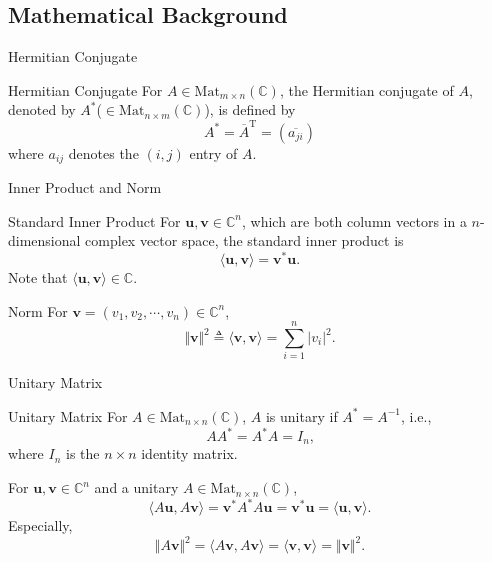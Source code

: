 \documentclass{beamer}
\newcommand{\mbb}[1]{\mathbb{#1}}
\newcommand{\mbf}[1]{\mathbf{#1}}
\newcommand{\mrm}[1]{\mathrm{#1}}
\renewcommand{\:}{\text{ }}
\begin{document}
    \subsection{Mathematical Background}
    \begin{frame}{Hermitian Conjugate}
        \begin{exampleblock}{Hermitian Conjugate}
            For $A \in \mrm{Mat}_{m \times n}(\mbb{C})$, the \alert{Hermitian conjugate} of $A$, denoted by $A^\ast$($\in \mrm{Mat}_{n \times m}(\mbb{C})$), is defined by
            \[ A^\ast = \overline{A}^\mrm{T} = (\overline{a_{ji}}) \]
            where $a_{ij}$ denotes the $(i, j)$ entry of $A$.
        \end{exampleblock}
    \end{frame}

    \begin{frame}{Inner Product and Norm}
        \begin{exampleblock}{Standard Inner Product}
            For $\mbf{u}, \mbf{v} \in \mbb{C}^n$, which are both column vectors in a $n$-dimensional complex vector space,
            the standard inner product is
            \[ \langle \mbf{u}, \mbf{v} \rangle = \mbf{v}^\ast \mbf{u}\text{.} \]
            Note that $\langle \mbf{u}, \mbf{v} \rangle \in \mbb{C}$.
        \end{exampleblock}
        \begin{exampleblock}{Norm}
            For $\mbf{v} = (v_1, v_2, \cdots, v_n) \in \mbb{C}^n$,
            \[ \Vert \mbf{v} \Vert^2 \triangleq \langle \mbf{v}, \mbf{v} \rangle = \sum_{i=1}^n |v_i|^2\text{.} \]
        \end{exampleblock}
    \end{frame}

    \begin{frame}{Unitary Matrix}
        \begin{exampleblock}{Unitary Matrix}
            For $A \in \mrm{Mat}_{n \times n}(\mbb{C})$, $A$ is \alert{unitary} if $A^\ast = A^{-1}$, i.e.,
            \[ A A^\ast = A^\ast A = I_n\text{,} \]
            where $I_n$ is the $n \times n$ identity matrix.
        \end{exampleblock}
        \begin{alertblock}{}
            For $\mbf{u}, \mbf{v} \in \mbb{C}^n$ and a unitary $A \in \mrm{Mat}_{n \times n}(\mbb{C})$,
            \[ \langle A\mbf{u}, A\mbf{v} \rangle = \mbf{v}^\ast A^\ast A \mbf{u} = \mbf{v}^\ast \mbf{u} = \langle \mbf{u}, \mbf{v} \rangle\text{.} \]
            Especially,
            \[ \Vert A\mbf{v} \Vert^2 = \langle A\mbf{v}, A\mbf{v} \rangle = \langle \mbf{v}, \mbf{v} \rangle = \Vert \mbf{v} \Vert^2 \text{.} \]
        \end{alertblock}
    \end{frame}
\end{document}

